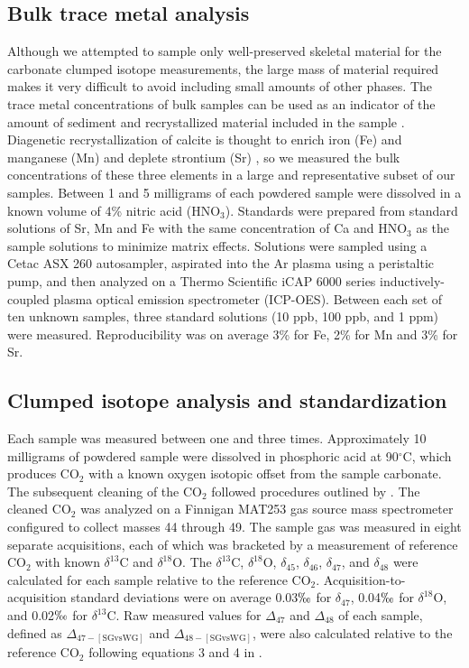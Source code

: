 \documentclass{article}
\newcommand{\deltao}{$\delta^{18}$}
\newcommand{\deltac}{$\delta^{13}$}
\newcommand{\degrees}{$^{\circ}$}
\begin{document}
\subsection{Bulk trace metal analysis}

Although we attempted to sample only well-preserved skeletal material for the carbonate clumped isotope measurements, the large mass of material required makes it very difficult to avoid including small amounts of other phases. The trace metal concentrations of bulk samples can be used as an indicator of the amount of sediment and recrystallized material included in the sample \citep{Azmy1998,Brand2012,Came2007,Finnegan2011}. Diagenetic recrystallization of calcite is thought to enrich iron (Fe) and manganese (Mn) and deplete strontium (Sr) \citep{Brand1980,Shields2003}, so we measured the bulk concentrations of these three elements in a large and representative subset of our samples. Between 1 and 5 milligrams of each powdered sample were dissolved in a known volume of 4\% nitric acid (HNO$_3$). Standards were prepared from standard solutions of Sr, Mn and Fe with the same concentration of Ca and HNO$_3$ as the sample solutions to minimize matrix effects. Solutions were sampled using a Cetac ASX 260 autosampler, aspirated into the Ar plasma using a peristaltic pump, and then analyzed on a Thermo Scientific iCAP 6000 series inductively-coupled plasma optical emission spectrometer (ICP-OES). Between each set of ten unknown samples, three standard solutions (10 ppb, 100 ppb, and 1 ppm) were measured. Reproducibility was on average 3\% for Fe, 2\% for Mn and 3\% for Sr. 

\subsection{Clumped isotope analysis and standardization}

Each sample was measured between one and three times. Approximately 10 milligrams of powdered sample were dissolved in phosphoric acid at 90\degrees C, which produces CO$_2$ with a known oxygen isotopic offset from the sample carbonate. The subsequent cleaning of the CO$_2$ followed procedures outlined by \cite{Ghosh2006}. The cleaned CO$_2$ was analyzed on a Finnigan MAT253 gas source mass spectrometer configured to collect masses 44 through 49. The sample gas was measured in eight separate acquisitions, each of which was bracketed by a measurement of reference CO$_2$ with known \deltac C and \deltao O. The \deltac C, \deltao O, $\delta_{45}$, $\delta_{46}$, $\delta_{47}$, and $\delta_{48}$ were calculated for each sample relative to the reference CO$_2$. Acquisition-to-acquisition standard deviations were on average 0.03$\permil$ for $\delta_{47}$, 0.04$\permil$ for \deltao O, and 0.02$\permil$ for \deltac C. Raw measured values for $\Delta_{47}$ and $\Delta_{48}$ of each sample, defined as $\Delta_{47-[\text{SGvsWG}]}$ and $\Delta_{48-[\text{SGvsWG}]}$, were also calculated relative to the reference CO$_2$ following equations 3 and 4 in \cite{Huntington2009}.
\end{document}
